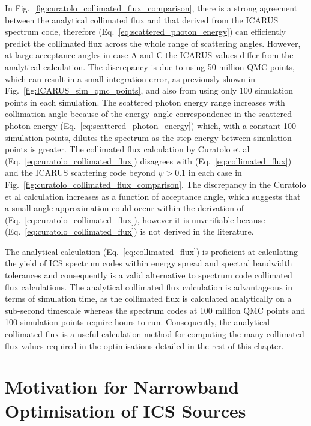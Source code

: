 \documentclass[../main.tex]{subfiles}
\begin{document}
In Fig.~\ref{fig:curatolo_collimated_flux_comparison}, there is a strong agreement between the analytical collimated flux and that derived from the \textsc{ICARUS} spectrum code, therefore (Eq.~\ref{eq:scattered_photon_energy}) can efficiently predict the collimated flux across the whole range of scattering angles. However, at large acceptance angles in case A and C the \textsc{ICARUS} values differ from the analytical calculation. The discrepancy is due to using 50 million QMC points, which can result in a small integration error, as previously shown in Fig.~\ref{fig:ICARUS_sim_qmc_points}, and also from using only 100 simulation points in each simulation. The scattered photon energy range increases with collimation angle because of the energy--angle correspondence  in the scattered photon energy (Eq.~\ref{eq:scattered_photon_energy}) which, with a constant 100 simulation points, dilutes the spectrum as the step energy between simulation points is greater. The collimated flux calculation by Curatolo et al \cite{curatolo2017analytical} (Eq.~\ref{eq:curatolo_collimated_flux}) disagrees with (Eq.~\ref{eq:collimated_flux}) and the \textsc{ICARUS} scattering code beyond $\psi>0.1$ in each case in Fig.~\ref{fig:curatolo_collimated_flux_comparison}. The discrepancy in the Curatolo et al calculation increases as a function of acceptance angle, which suggests that a small angle approximation could occur within the derivation of (Eq.~\ref{eq:curatolo_collimated_flux}), however it is unverifiable because (Eq.~\ref{eq:curatolo_collimated_flux}) is not derived in the literature.  

The analytical calculation (Eq.~\ref{eq:collimated_flux}) is proficient at calculating the yield of ICS spectrum codes within energy spread and spectral bandwidth tolerances and consequently is a valid alternative to spectrum code collimated flux calculations. The analytical collimated flux calculation is advantageous in terms of simulation time, as the collimated flux is calculated analytically on a sub-second timescale whereas the spectrum codes at 100 million QMC points and 100 simulation points require hours to run. Consequently, the analytical collimated flux is a useful calculation method for computing the many collimated flux values required in the optimisations detailed in the rest of this chapter.   

\section{Motivation for Narrowband Optimisation of ICS Sources}
\label{sec:motivation_optimisation}
\end{document}
